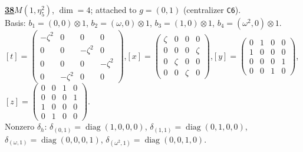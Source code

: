 \begin{samepage}\noindent\textbf{\underline{38}}\quad $M(1,\eta^{2}_{5})$, $\dim=4$; attached to $g=(0,1)$ (centralizer \texttt{C6}).\\
Basis: $b_{1}=(0,0)\otimes 1$, $b_{2}=(\omega,0)\otimes 1$, $b_{3}=(1,0)\otimes 1$, $b_{4}=(\omega^2,0)\otimes 1$.\\
$[t]=\left(\begin{smallmatrix} -\zeta^2 & 0 & 0 & 0 \\ 0 & 0 & -\zeta^2 & 0 \\ 0 & 0 & 0 & -\zeta^2 \\ 0 & -\zeta^2 & 0 & 0 \end{smallmatrix}\right)$,\quad $[x]=\left(\begin{smallmatrix} \zeta & 0 & 0 & 0 \\ 0 & 0 & 0 & \zeta \\ 0 & \zeta & 0 & 0 \\ 0 & 0 & \zeta & 0 \end{smallmatrix}\right)$,\quad $[y]=\left(\begin{smallmatrix} 0 & 1 & 0 & 0 \\ 1 & 0 & 0 & 0 \\ 0 & 0 & 0 & 1 \\ 0 & 0 & 1 & 0 \end{smallmatrix}\right)$,\quad $[z]=\left(\begin{smallmatrix} 0 & 0 & 1 & 0 \\ 0 & 0 & 0 & 1 \\ 1 & 0 & 0 & 0 \\ 0 & 1 & 0 & 0 \end{smallmatrix}\right)$.\\
Nonzero $\delta_h$: $\delta_{(0,1)}=\operatorname{diag}(1,0,0,0)$, $\delta_{(1,1)}=\operatorname{diag}(0,1,0,0)$, $\delta_{(\omega,1)}=\operatorname{diag}(0,0,0,1)$, $\delta_{(\omega^2,1)}=\operatorname{diag}(0,0,1,0)$.\end{samepage}
\medskip

